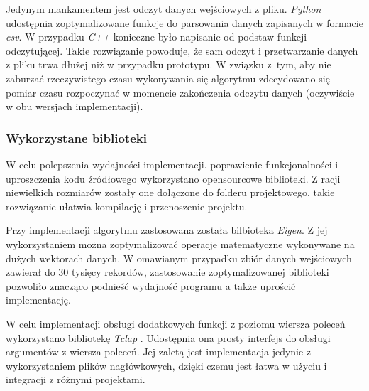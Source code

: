 Jedynym mankamentem jest odczyt danych wejściowych z pliku. \textit{Python} udostępnia zoptymalizowane funkcje do parsowania danych zapisanych w formacie \textit{csv}. W przypadku \textit{C++} konieczne było napisanie od podstaw funkcji odczytującej. Takie rozwiązanie powoduje, że sam odczyt i przetwarzanie danych z pliku trwa dłużej niż w przypadku prototypu. W związku z~tym, aby nie zaburzać rzeczywistego czasu wykonywania się algorytmu zdecydowano się pomiar czasu rozpoczynać w momencie zakończenia odczytu danych (oczywiście w obu wersjach implementacji).

\subsubsection{Wykorzystane biblioteki}
W celu polepszenia wydajności implementacji. poprawienie funkcjonalności i uproszczenia kodu źródłowego wykorzystano opensourcowe biblioteki. Z racji niewielkich rozmiarów zostały one dołączone do folderu projektowego, takie rozwiązanie ułatwia kompilację i przenoszenie projektu.

Przy implementacji algorytmu zastosowana została bilbioteka \textit{Eigen}\cite{eigen}. Z jej wykorzystaniem można zoptymalizować operacje matematyczne wykonywane na dużych wektorach danych. W omawianym przypadku zbiór danych wejściowych zawierał do 30 tysięcy rekordów, zastosowanie zoptymalizowanej biblioteki pozwoliło znacząco podnieść wydajność programu a także uprościć implementację.

W celu implementacji obsługi dodatkowych funkcji z poziomu wiersza poleceń wykorzystano bibliotekę \textit{Tclap} \cite{tclap}. Udostępnia ona prosty interfejs do obsługi argumentów z wiersza poleceń. Jej zaletą jest implementacja jedynie z wykorzystaniem plików nagłówkowych, dzięki czemu jest łatwa w użyciu i integracji z różnymi projektami.


